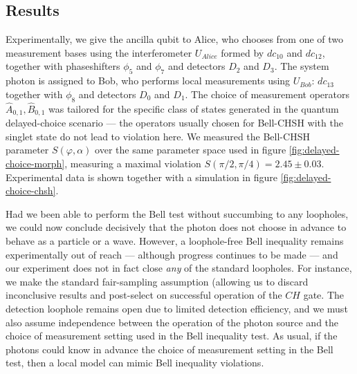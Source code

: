 \subsection{Results} 
Experimentally, we give the ancilla qubit to Alice, who chooses from one of two measurement bases using the interferometer $U_{Alice}$ formed by $dc_{10}$ and $dc_{12}$, together with phaseshifters $\phi_5$ and $\phi_7$ and detectors $D_2$ and $D_3$. The system photon is assigned to Bob, who performs local measurements using $U_{Bob}$: $dc_{13}$ together with $\phi_8$ and detectors $D_0$ and $D_1$. The choice of measurement operators $\hat{A}_{0,1}, \hat{B}_{0,1}$ was tailored for the specific class of states generated in the quantum delayed-choice scenario --- the operators usually chosen for Bell-CHSH with the singlet state do not lead to violation here. We measured the Bell-CHSH parameter $S(\varphi, \alpha)$ over the same parameter space used in figure \ref{fig:delayed-choice-morph}, measuring a maximal violation $S(\pi/2, \pi/4) = 2.45 \pm 0.03$. Experimental data is shown together with a simulation in figure \ref{fig:delayed-choice-chsh}.

Had we been able to perform the Bell test without succumbing to any loopholes, we could now conclude decisively that the photon does not choose in advance to behave as a particle or a wave. However, a loophole-free Bell inequality remains experimentally out of reach --- although progress continues to be made \cite{Scheidl2010, Giustina2013a} --- and our experiment does not in fact close \emph{any} of the standard loopholes.  For instance, we make the standard fair-sampling assumption (allowing us to discard inconclusive results and post-select on successful operation of the $CH$ gate.  The detection loophole remains open due to limited detection efficiency, and we must also assume independence between the operation of the photon source and the choice of measurement setting used in the Bell inequality test. As usual, if the photons could know in advance the choice of measurement setting in the Bell test, then a local model can mimic Bell inequality violations.  

